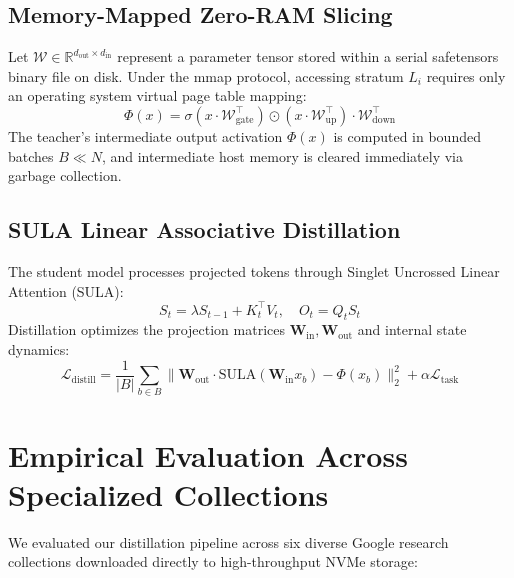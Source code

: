 \documentclass[11pt,a4paper]{article}
\begin{document}
\subsection{Memory-Mapped Zero-RAM Slicing}
Let $\mathcal{W} \in \mathbb{R}^{d_{\text{out}} \times d_{\text{in}}}$ represent a parameter tensor stored within a serial safetensors binary file on disk. Under the mmap protocol, accessing stratum $L_i$ requires only an operating system virtual page table mapping:
\begin{equation}
  \Phi(x) = \sigma\left( x \cdot \mathcal{W}_{\text{gate}}^\top \right) \odot \left( x \cdot \mathcal{W}_{\text{up}}^\top \right) \cdot \mathcal{W}_{\text{down}}^\top
\end{equation}
The teacher's intermediate output activation $\Phi(x)$ is computed in bounded batches $B \ll N$, and intermediate host memory is cleared immediately via garbage collection.

\subsection{SULA Linear Associative Distillation}
The student model processes projected tokens through Singlet Uncrossed Linear Attention (SULA):
\begin{equation}
  S_t = \lambda S_{t-1} + K_t^\top V_t, \quad O_t = Q_t S_t
\end{equation}
Distillation optimizes the projection matrices $\mathbf{W}_{\text{in}}, \mathbf{W}_{\text{out}}$ and internal state dynamics:
\begin{equation}
  \mathcal{L}_{\text{distill}} = \frac{1}{|B|} \sum_{b \in B} \|\mathbf{W}_{\text{out}} \cdot \text{SULA}(\mathbf{W}_{\text{in}} x_b) - \Phi(x_b)\|_2^2 + \alpha \mathcal{L}_{\text{task}}
\end{equation}

\section{Empirical Evaluation Across Specialized Collections}

We evaluated our distillation pipeline across six diverse Google research collections downloaded directly to high-throughput NVMe storage:
\end{document}
